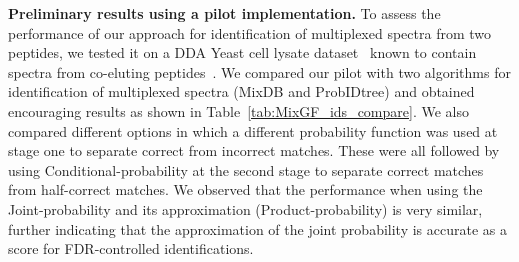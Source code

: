 \documentclass[arial,11pt]{article}
\begin{document}
{\bf Preliminary results using a pilot implementation.} To assess the performance of our approach for identification of multiplexed spectra from two peptides, we tested it on a DDA Yeast cell lysate dataset~\cite{li2009} known to contain spectra from co-eluting peptides~\cite{wang2010msplit}.  We compared our pilot with two algorithms  for identification of multiplexed spectra (MixDB and ProbIDtree) and obtained encouraging results as shown in Table~\ref{tab:MixGF_ids_compare}.%
We also compared different options in which a different probability function was used at stage one to separate correct from incorrect matches.  These were all followed by using Conditional-probability at the second stage to separate correct matches from half-correct matches.  We observed that the performance when using the Joint-probability and its approximation (Product-probability) is very similar, further indicating that the approximation of the joint probability is accurate as a score for FDR-controlled identifications.
\end{document}
